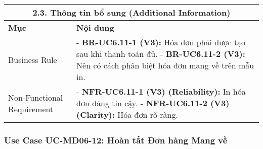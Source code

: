 \begin{longtable}{|m{4cm}|p{11cm}|}
\hline
\multicolumn{2}{|c|}{\textbf{2.3. Thông tin bổ sung (Additional Information)}} \\
\hline
\textbf{Mục} & \textbf{Nội dung} \\
\hline
Business Rule & - \textbf{BR-UC6.11-1 (V3):} Hóa đơn phải được tạo sau khi thanh toán đủ. \newline - \textbf{BR-UC6.11-2 (V3):} Nên có cách phân biệt hóa đơn mang về trên mẫu in. \\
\hline
Non-Functional Requirement & - \textbf{NFR-UC6.11-1 (V3) (Reliability):} In hóa đơn đáng tin cậy. \newline - \textbf{NFR-UC6.11-2 (V3) (Clarity):} Hóa đơn rõ ràng. \\
\hline
\end{longtable}

\subsubsection{Use Case UC-MD06-12: Hoàn tất Đơn hàng Mang về}

